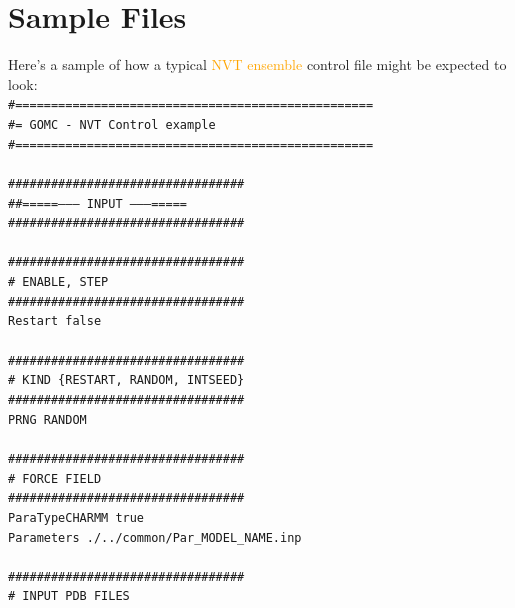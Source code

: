 \section{Sample Files}
Here's a sample of how a typical \textcolor{orange}{NVT ensemble} control file might be expected to look:\\
\texttt{\#==================================================}\\
\texttt{\#=       GOMC - NVT Control example     }\\
\texttt{\#==================================================}\\
\texttt{}\\
\texttt{\#\#\#\#\#\#\#\#\#\#\#\#\#\#\#\#\#\#\#\#\#\#\#\#\#\#\#\#\#\#\#\#\#}\\
\texttt{\#\#=====--------  INPUT  --------=====}\\
\texttt{\#\#\#\#\#\#\#\#\#\#\#\#\#\#\#\#\#\#\#\#\#\#\#\#\#\#\#\#\#\#\#\#\#}\\
\texttt{}\\
\texttt{\#\#\#\#\#\#\#\#\#\#\#\#\#\#\#\#\#\#\#\#\#\#\#\#\#\#\#\#\#\#\#\#\#}\\
\texttt{\# ENABLE, STEP}\\
\texttt{\#\#\#\#\#\#\#\#\#\#\#\#\#\#\#\#\#\#\#\#\#\#\#\#\#\#\#\#\#\#\#\#\#}\\
\texttt{Restart	 	false}\\
\texttt{}\\
\texttt{\#\#\#\#\#\#\#\#\#\#\#\#\#\#\#\#\#\#\#\#\#\#\#\#\#\#\#\#\#\#\#\#\#}\\
\texttt{\# KIND \{RESTART, RANDOM, INTSEED\}}\\
\texttt{\#\#\#\#\#\#\#\#\#\#\#\#\#\#\#\#\#\#\#\#\#\#\#\#\#\#\#\#\#\#\#\#\#}\\
\texttt{PRNG     	RANDOM}\\
\texttt{}\\
\texttt{\#\#\#\#\#\#\#\#\#\#\#\#\#\#\#\#\#\#\#\#\#\#\#\#\#\#\#\#\#\#\#\#\#}\\
\texttt{\# FORCE FIELD}\\
\texttt{\#\#\#\#\#\#\#\#\#\#\#\#\#\#\#\#\#\#\#\#\#\#\#\#\#\#\#\#\#\#\#\#\#}\\
\texttt{ParaTypeCHARMM	 true}\\
\texttt{Parameters     	 ./../common/Par\_MODEL\_NAME.inp}\\
\texttt{}\\
\texttt{\#\#\#\#\#\#\#\#\#\#\#\#\#\#\#\#\#\#\#\#\#\#\#\#\#\#\#\#\#\#\#\#\#}\\
\texttt{\# INPUT PDB FILES}\\
